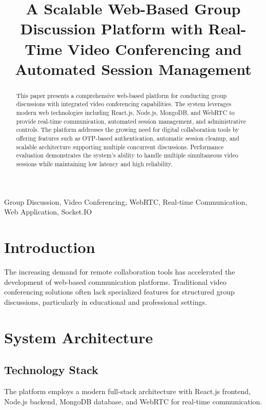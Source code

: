 \documentclass[journal]{IEEEtran}
\begin{document}
\title{A Scalable Web-Based Group Discussion Platform with Real-Time Video Conferencing and Automated Session Management}

\author{
}

\maketitle

\begin{abstract}
This paper presents a comprehensive web-based platform for conducting group discussions with integrated video conferencing capabilities. The system leverages modern web technologies including React.js, Node.js, MongoDB, and WebRTC to provide real-time communication, automated session management, and administrative controls. The platform addresses the growing need for digital collaboration tools by offering features such as OTP-based authentication, automatic session cleanup, and scalable architecture supporting multiple concurrent discussions. Performance evaluation demonstrates the system's ability to handle multiple simultaneous video sessions while maintaining low latency and high reliability.
\end{abstract}

\begin{IEEEkeywords}
Group Discussion, Video Conferencing, WebRTC, Real-time Communication, Web Application, Socket.IO
\end{IEEEkeywords}

\section{Introduction}
The increasing demand for remote collaboration tools has accelerated the development of web-based communication platforms. Traditional video conferencing solutions often lack specialized features for structured group discussions, particularly in educational and professional settings.

\section{System Architecture}
\subsection{Technology Stack}
The platform employs a modern full-stack architecture with React.js frontend, Node.js backend, MongoDB database, and WebRTC for real-time communication.
\end{document}
